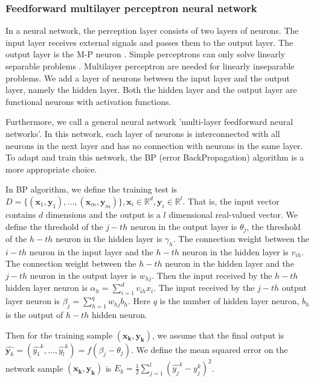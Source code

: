 \subsubsection{Feedforward multilayer perceptron neural network}

\noindent

In a neural network, the perception layer consists of two layers of neurons. The input layer receives external signals and passes them to the output layer. The output layer is the M-P neuron \cite{mcculloch1943logical}. Simple perceptrons can only solve linearly separable problems \cite{minsky1969introduction}. Multilayer perceptron are needed for linearly inseparable problems. We add a layer of neurons between the input layer and the output layer, namely the hidden layer. Both the hidden layer and the output layer are functional neurons with activation functions.

Furthermore, we call a general neural network 'multi-layer feedforward neural networks'. In this network, each layer of neurons is interconnected with all neurons in the next layer and has no connection with neurons in the same layer. To adapt and train this network, the BP (error BackPropagation) algorithm is a more appropriate choice.

In BP algorithm, we define the training test is $D = \{(\bm{x}_1,\bm{y}_1),...,(\bm{x}_m,\bm{y}_m)\}, \bm{x}_i\in\mathbb{R}^d, \bm{y}_i\in\mathbb{R}^l$. That is, the input vector contains $d$ dimensions and the output is a $l$ dimensional real-valued vector. We define the threshold of the $j-th$ neuron in the output layer is $\theta_j$, the threshold of the $h-th$ neuron in the hidden layer is $\gamma_h$. The connection weight between the $i-th$ neuron in the input layer and the $h-th$ neuron in the hidden layer is $v_{ih}$. The connection weight between the $h-th$ neuron in the hidden layer and the $j-th$ neuron in the output layer is $w_{hj}$. Then the input received by the $h-th$ hidden layer neuron is $\alpha_h = \sum_{i = 1}^{d}v_{ih}x_{i}$. The input received by the $j-th$ output layer neuron is $\beta_j = \sum_{h = 1}^{q}w_{hj}b_{h}$. Here $q$ is the number of hidden layer neuron, $b_h$ is the output of $h-th$ hidden neuron. 

Then for the training sample $(\bm{x_k,\bm{y}_k})$, we assume that the final output is $\hat{\bm{y}_k} = (\hat{y_1}^k,...,\hat{y_l}^k) = f(\beta_j - \theta_j)$. We define the mean squared error on the network sample $(\bm{x_k,\bm{y}_k})$ is $E_k = \frac{1}{2}\sum_{j=1}^l(\hat{y_j}^k - y_j^k)^2$. 

